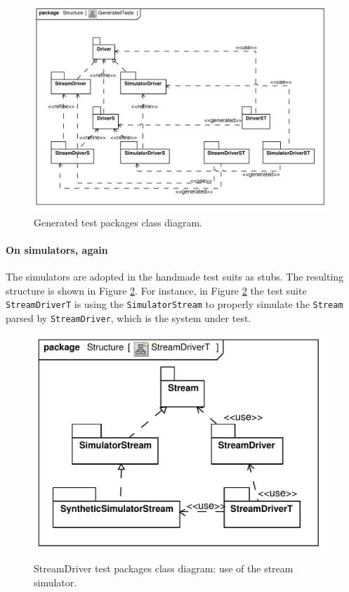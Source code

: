 \documentclass{article}
\newcommand{\lil}[1]{\texttt{\lstinline|#1|}}
\begin{document}
\begin{figure}[htb!]
  \centering
  \includegraphics[scale=0.7]{UML_model/Class_Diagram__Structure__GeneratedTests}
  \caption{Generated test packages class diagram.}
  \label{fig:class_diagram_generatedtest}
\end{figure}

\paragraph*{On simulators, again}

The simulators are adopted in the handmade test suits as stubs.
The resulting structure is shown in Figure \ref{fig:class_diagram_streamdriver_test}.  
For instance, in Figure \ref{fig:class_diagram_streamdriver_test} the test suite \lil{StreamDriverT} is using the \lil{SimulatorStream} to properly simulate the \lil{Stream} parsed by \lil{StreamDriver}, which is the system under test.

\begin{figure}[htb!]
  \centering
  \includegraphics[scale=0.4]{UML_model/Class_Diagram__Structure__StreamDriverT}
  \caption{StreamDriver test packages class diagram: use of the stream
    simulator.}
  \label{fig:class_diagram_streamdriver_test}
\end{figure}
\end{document}
